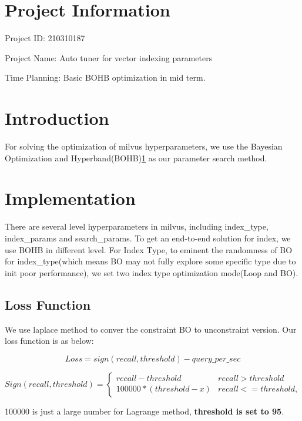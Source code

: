 \hypertarget{project-information}{%
\section{Project Information}\label{project-information}}

Project ID: 210310187

Project Name: Auto tuner for vector indexing parameters

Time Planning: Basic BOHB optimization in mid term.

\hypertarget{introduction}{%
\section{Introduction}\label{introduction}}

For solving the optimization of milvus hyperparameters, we use the
Bayesian Optimization and
Hyperband(BOHB)\protect\hyperlink{refer-anchor-1}{1} as our parameter
search method.

\hypertarget{implementation}{%
\section{Implementation}\label{implementation}}

There are several level hyperparameters in milvus, including
index\_type, index\_params and search\_params. To get an end-to-end
solution for index, we use BOHB in different level. For Index Type, to
eminent the randomness of BO for index\_type(which means BO may not
fully explore some specific type due to init poor performance), we set
two index type optimization mode(Loop and BO).

\hypertarget{loss-function}{%
\subsection{Loss Function}\label{loss-function}}

We use laplace method to conver the constraint BO to unconstraint
version. Our loss function is as below:

\[ Loss = sign(recall, threshold) - query\_per\_sec \]

\[Sign(recall, threshold) = 
\begin{cases}  
recall - threshold & recall>threshold \\
100000 * (threshold - x) & recall<=threshold,
\end{cases}\]

100000 is just a large number for Lagrange method, \textbf{threshold is
set to 95}.


